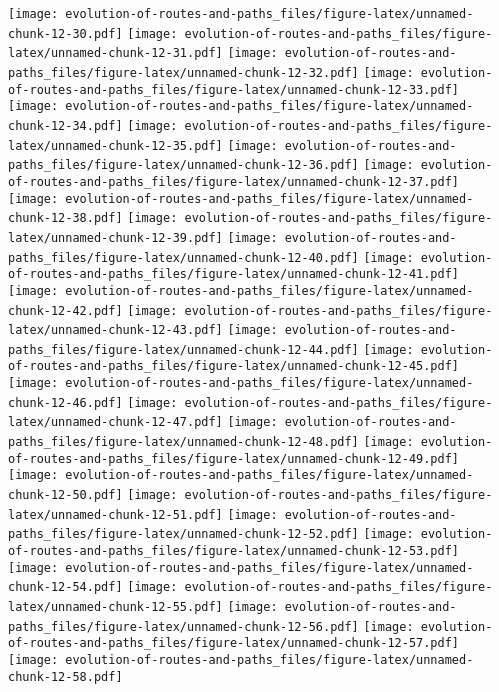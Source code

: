 \documentclass[]{elsarticle} %
\makeatletter
\def\maxwidth{\ifdim\Gin@nat@width>\linewidth\linewidth
\else\Gin@nat@width\fi}
\let\Oldincludegraphics\includegraphics
\renewcommand{\includegraphics}[1]{\Oldincludegraphics[width=\maxwidth]{#1}}
\makeatother
\begin{document}
\texttt{[image: evolution-of-routes-and-paths\_files/figure-latex/unnamed-chunk-12-30.pdf]}
\texttt{[image: evolution-of-routes-and-paths\_files/figure-latex/unnamed-chunk-12-31.pdf]}
\texttt{[image: evolution-of-routes-and-paths\_files/figure-latex/unnamed-chunk-12-32.pdf]}
\texttt{[image: evolution-of-routes-and-paths\_files/figure-latex/unnamed-chunk-12-33.pdf]}
\texttt{[image: evolution-of-routes-and-paths\_files/figure-latex/unnamed-chunk-12-34.pdf]}
\texttt{[image: evolution-of-routes-and-paths\_files/figure-latex/unnamed-chunk-12-35.pdf]}
\texttt{[image: evolution-of-routes-and-paths\_files/figure-latex/unnamed-chunk-12-36.pdf]}
\texttt{[image: evolution-of-routes-and-paths\_files/figure-latex/unnamed-chunk-12-37.pdf]}
\texttt{[image: evolution-of-routes-and-paths\_files/figure-latex/unnamed-chunk-12-38.pdf]}
\texttt{[image: evolution-of-routes-and-paths\_files/figure-latex/unnamed-chunk-12-39.pdf]}
\texttt{[image: evolution-of-routes-and-paths\_files/figure-latex/unnamed-chunk-12-40.pdf]}
\texttt{[image: evolution-of-routes-and-paths\_files/figure-latex/unnamed-chunk-12-41.pdf]}
\texttt{[image: evolution-of-routes-and-paths\_files/figure-latex/unnamed-chunk-12-42.pdf]}
\texttt{[image: evolution-of-routes-and-paths\_files/figure-latex/unnamed-chunk-12-43.pdf]}
\texttt{[image: evolution-of-routes-and-paths\_files/figure-latex/unnamed-chunk-12-44.pdf]}
\texttt{[image: evolution-of-routes-and-paths\_files/figure-latex/unnamed-chunk-12-45.pdf]}
\texttt{[image: evolution-of-routes-and-paths\_files/figure-latex/unnamed-chunk-12-46.pdf]}
\texttt{[image: evolution-of-routes-and-paths\_files/figure-latex/unnamed-chunk-12-47.pdf]}
\texttt{[image: evolution-of-routes-and-paths\_files/figure-latex/unnamed-chunk-12-48.pdf]}
\texttt{[image: evolution-of-routes-and-paths\_files/figure-latex/unnamed-chunk-12-49.pdf]}
\texttt{[image: evolution-of-routes-and-paths\_files/figure-latex/unnamed-chunk-12-50.pdf]}
\texttt{[image: evolution-of-routes-and-paths\_files/figure-latex/unnamed-chunk-12-51.pdf]}
\texttt{[image: evolution-of-routes-and-paths\_files/figure-latex/unnamed-chunk-12-52.pdf]}
\texttt{[image: evolution-of-routes-and-paths\_files/figure-latex/unnamed-chunk-12-53.pdf]}
\texttt{[image: evolution-of-routes-and-paths\_files/figure-latex/unnamed-chunk-12-54.pdf]}
\texttt{[image: evolution-of-routes-and-paths\_files/figure-latex/unnamed-chunk-12-55.pdf]}
\texttt{[image: evolution-of-routes-and-paths\_files/figure-latex/unnamed-chunk-12-56.pdf]}
\texttt{[image: evolution-of-routes-and-paths\_files/figure-latex/unnamed-chunk-12-57.pdf]}
\texttt{[image: evolution-of-routes-and-paths\_files/figure-latex/unnamed-chunk-12-58.pdf]}
\end{document}
